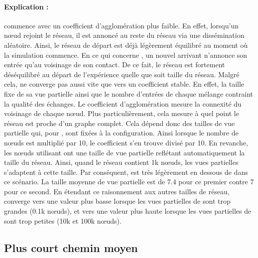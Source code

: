 \paragraph{Explication :} \CYCLON commence avec un coefficient d'agglomération
plus faible. En effet, lorsqu'un nœud rejoint le réseau, il est annoncé au reste
du réseau via une dissémination aléatoire. Ainsi, le réseau de départ est déjà
légèrement équilibré au moment où la simulation commence. En ce qui concerne
\SPRAY, un nouvel arrivant n'annonce son entrée qu'au voisinage de son
contact. De ce fait, le réseau est fortement déséquilibré au départ de
l'expérience quelle que soit taille du réseau. Malgré cela, \CYCLON ne converge
pas aussi vite que \SPRAY vers un coefficient stable. En effet, la taille fixe
de sa vue partielle ainsi que le nombre d'entrées de chaque mélange contraint la
qualité des échanges.  Le coefficient d'agglomération mesure la connexité du
voisinage de chaque nœud. Plus particulièrement, cela mesure à quel point le
réseau est proche d'un graphe complet. Cela dépend donc des tailles de vue
partielle qui, pour \CYCLON, sont fixées à la configuration.  Ainsi lorsque le
nombre de nœuds est multiplié par 10, le coefficient s'en trouve divisé par
10. En revanche, les nœuds utilisant \SPRAY ont une taille de vue partielle
reflétant automatiquement la taille du réseau.  Ainsi, quand le réseau contient
1k nœuds, les vues partielles s'adaptent à cette taille. Par conséquent, \SPRAY
est très légèrement en dessous de \CYCLON dans ce scénario. La taille moyenne de
vue partielle est de 7.4 pour ce premier contre 7 pour ce second. En étendant ce
raisonnement aux autres tailles de réseau, \SPRAY converge vers une valeur plus
basse lorsque les vues partielles de \CYCLON sont trop grandes (0.1k nœuds), et
vers une valeur plus haute lorsque les vues partielles de \CYCLON sont trop
petites (10k et 100k nœuds).

\subsection{Plus court chemin moyen}
\label{net:subsec:shortestpath}

